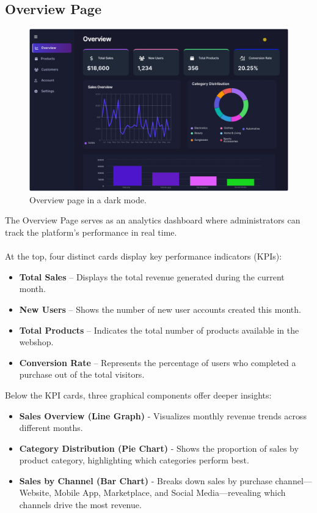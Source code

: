\documentclass[12pt]{article}
\begin{document}
	\subsection{Overview Page}\label{subsec:overview-page}

	\begin{figure}[h]
		\centering
		\includegraphics[width=1\textwidth]{pictures/admin/Overview_Admin}
		\caption{Overview page in a dark mode.}\label{fig:figure1}
	\end{figure}

	\vspace{0.3cm}
	The Overview Page serves as an analytics dashboard where administrators can track the platform’s performance in real time. \\ \\
	At the top, four distinct cards display key performance indicators (KPIs):
	\begin{itemize}
		\item \textbf{Total Sales} – Displays the total revenue generated during the current month.
		\item \textbf{New Users} – Shows the number of new user accounts created this month.
		\item \textbf{Total Products} – Indicates the total number of products available in the webshop.
		\item \textbf{Conversion Rate} – Represents the percentage of users who completed a purchase out of the total visitors.
	\end{itemize}
	Below the KPI cards, three graphical components offer deeper insights:
	\begin{itemize}
		\item \textbf{Sales Overview (Line Graph)} - Visualizes monthly revenue trends across different months.
		\item \textbf{Category Distribution (Pie Chart)} - Shows the proportion of sales by product category, highlighting which categories perform best.
		\item \textbf{Sales by Channel (Bar Chart)} - Breaks down sales by purchase channel—Website, Mobile App, Marketplace, and Social Media—revealing which channels drive the most revenue.
	\end{itemize}
\end{document}
